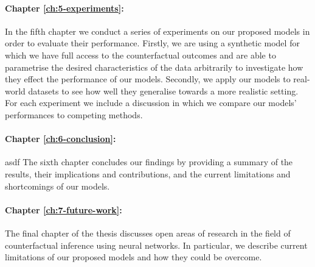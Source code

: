\paragraph{Chapter \ref{ch:5-experiments}: }
In the fifth chapter we conduct a series of experiments on our proposed models in order to evaluate their performance. Firstly, we are using a synthetic model for which we have full access to the counterfactual outcomes and are able to parametrise the desired characteristics of the data arbitrarily to investigate how they effect the performance of our models. Secondly, we apply our models to real-world datasets to see how well they generalise towards a more realistic setting. For each experiment we include a discussion in which we compare our models' performances to competing methods.

\paragraph{Chapter \ref{ch:6-conclusion}: }asdf
The sixth chapter concludes our findings by providing a summary of the results, their implications and contributions, and the current limitations and shortcomings of our models. 

\paragraph{Chapter \ref{ch:7-future-work}: }
The final chapter of the thesis discusses open areas of research in the field of counterfactual inference using neural networks. In particular, we describe current limitations of our proposed models and how they could be overcome. 
